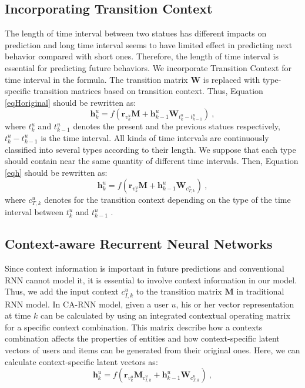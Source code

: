 \documentclass[conference]{IEEEtran}
\begin{document}
\subsection{ Incorporating Transition Context}
The length of time interval between two statues has different impacts on prediction and long time interval seems to have limited effect in predicting next behavior compared with short ones. Therefore, the length of time interval is essential for predicting future behaviors. We incorporate Transition Context for time interval in the formula. The transition matrix $\textbf{W}$ is replaced with type-specific transition matrices based on transition context. Thus, Equation \ref{eqHoriginal} should be rewritten as: 
\begin{equation}  \label{eqh}
\textbf{h}_{k}^{u}=f\left ( \textbf{r}_{v_{k}^{u}}\textbf{M}+\textbf{h}_{k-1}^{u}\textbf{W}_{ t_k^u-t_{k-1}^u  }\right )~,
\end{equation}
 where $t_k^u$ and $t_{k-1}^u$ denotes the present and the previous statues respectively, $t_k^u-t_{k-1}^u$ is the time interval.  All kinds of time intervals are continuously classified into several types according to their length. We suppose that each type should contain near the same quantity of different time intervals. Then, Equation \ref{eqh} should be rewritten as: 
\begin{equation}  
\textbf{h}_{k}^{u}=f\left ( \textbf{r}_{v_{k}^{u}}\textbf{M}+\textbf{h}_{k-1}^{u}\textbf{W}_{c_{T,k}^{u}}\right )~,
\end{equation}
where $c_{T,k}^{u}$ denotes for the transition context depending on the type of the time interval between $t_k^u$ and $t_{k-1}^u$ .



\subsection{ Context-aware Recurrent Neural Networks}
Since context information is important in future predictions and conventional RNN cannot model it, it is essential to involve context information in our model. Thus, we add the input context $c_{I,k}^{u}$ to the transition matrix $\textbf{M}$ in traditional RNN model. In CA-RNN model, given a user $u$, his or her vector representation at time $k$ can be calculated by using an integrated contextual operating matrix for a specific context combination. This matrix describe how a contexts combination affects the properties of entities and how context-specific latent vectors of users and items can be generated from their original ones. Here, we can calculate context-specific latent vectors as: 
\begin{equation}\label{eqHt}
\textbf{h}_{k}^{u}=f\left ( \textbf{r}_{v_{k}^{u}}\textbf{M}_{c_{I,k}^{u}}+\textbf{h}_{k-1}^{u}\textbf{W}_{c_{T,k}^{u}}\right )~,
\end{equation}
\end{document}
